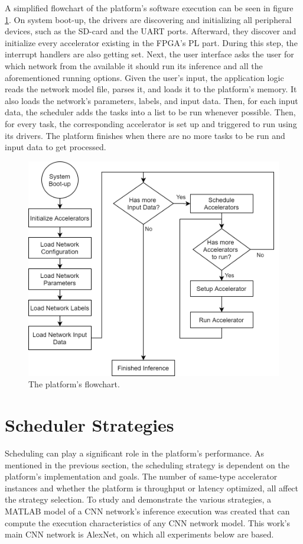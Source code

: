 A simplified flowchart of the platform's software execution can be seen in figure \ref{fig:platform-flowchart}. On system boot-up, the drivers are discovering and initializing all peripheral devices, such as the SD-card and the UART ports. Afterward, they discover and initialize every accelerator existing in the FPGA's PL part. During this step, the interrupt handlers are also getting set. Next, the user interface asks the user for which network from the available it should run its inference and all the aforementioned running options. Given the user's input, the application logic reads the network model file, parses it, and loads it to the platform's memory. It also loads the network's parameters, labels, and input data. Then, for each input data, the scheduler adds the tasks into a list to be run whenever possible. Then, for every task, the corresponding accelerator is set up and triggered to run using its drivers. The platform finishes when there are no more tasks to be run and input data to get processed.

\begin{figure} [H]
	\centering
	\includegraphics[width=\textwidth]{Images/Platform/PlatformFlowchart.png}
	\decoRule
	\caption[The platform's flowchart]{The platform's flowchart.}
	\label{fig:platform-flowchart}
\end{figure}

\section{Scheduler Strategies}
\label{sec:Scheduler-Strategies}
Scheduling can play a significant role in the platform's performance. As mentioned in the previous section, the scheduling strategy is dependent on the platform's implementation and goals. The number of same-type accelerator instances and whether the platform is throughput or latency optimized, all affect the strategy selection. To study and demonstrate the various strategies, a MATLAB model of a CNN network's inference execution was created that can compute the execution characteristics of any CNN network model. This work's main CNN network is AlexNet, on which all experiments below are based.

